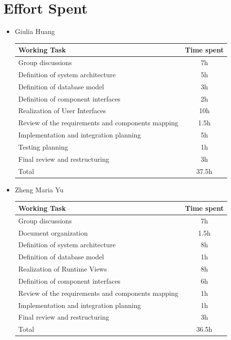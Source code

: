 \documentclass[12pt]{article}
\begin{document}
\section{Effort Spent}
\begin{itemize}
    \item Giulia Huang {
    \begin{center}
    \begin{tabular}{| l | c |}
    \hline
    Working Task & Time spent \\
    \hline
    Group discussions & 7h \\
    \hline
    Definition of system architecture & 5h \\
    \hline
    Definition of database model & 3h \\
    \hline
    Definition of component interfaces & 2h \\
    \hline
    Realization of User Interfaces & 10h \\
    \hline
    Review of the requirements and components mapping & 1.5h \\
    \hline
    Implementation and integration planning & 5h \\
    \hline
    Testing planning & 1h \\
    \hline
    Final review and restructuring & 3h \\
    \hline
    Total & 37.5h \\
    \hline
    \end{tabular}
    \end{center}
    }

\vspace{3em}
    \item Zheng Maria Yu {
    \begin{center}
    \begin{tabular}{| l | c |}
    \hline
    Working Task & Time spent \\
    \hline
    Group discussions & 7h \\
    \hline
    Document organization & 1.5h \\
    \hline
    Definition of system architecture & 8h \\
    \hline
    Definition of database model & 1h \\
    \hline
    Realization of Runtime Views & 8h \\
    \hline
    Definition of component interfaces & 6h \\
    \hline
    Review of the requirements and components mapping & 1h \\
    \hline
    Implementation and integration planning & 1h \\
    \hline
    Final review and restructuring & 3h \\
    \hline
    Total & 36.5h \\
    \hline
    \end{tabular}
    \end{center}
    }


\end{itemize}
\end{document}
